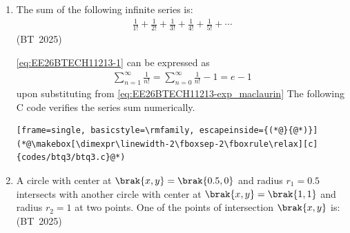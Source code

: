 \begin{enumerate}[label=\thesubsection.\arabic*, ref=\thesubsection.\theenumi,itemsep=0pt]

\item The sum of the following infinite series is:
\begin{align}
\frac{1}{1!} + \frac{1}{2!} + \frac{1}{3!} + \frac{1}{4!} + \frac{1}{5!} + \cdots
\label{eq:EE26BTECH11213-1}
\end{align}
\hfill (BT~2025)
\begin{enumerate}[itemsep=0pt]
\end{enumerate}
\solution
\eqref{eq:EE26BTECH11213-1}
can be expressed as
\begin{align}
\sum_{n=1}^{\infty} \frac{1}{n!} = 
\sum_{n=0}^{\infty} \frac{1}{n!} - 1 = e - 1
\end{align}
upon substituting from \eqref{eq:EE26BTECH11213-exp_maclaurin}
The following C code verifies the series sum numerically.
\begin{lstlisting}[frame=single, basicstyle=\rmfamily, escapeinside={(*@}{@*)}]
(*@\makebox[\dimexpr\linewidth-2\fboxsep-2\fboxrule\relax][c]{codes/btq3/btq3.c}@*)
\end{lstlisting}

\item A circle with center at $\brak{x, y} = \brak{0.5, 0}$ and radius $r_1 = 0.5$ intersects with another circle with center at $\brak{x, y} = \brak{1, 1}$ and radius $r_2 = 1$ at two points. One of the points of intersection $\brak{x, y}$ is:
\hfill (BT~2025)
\begin{enumerate}[itemsep=0pt]
\end{enumerate}


\end{enumerate}
